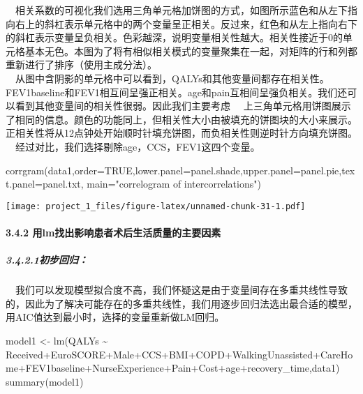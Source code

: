 \documentclass[
]{article}
\newenvironment{Shaded}{\begin{snugshade}}{\end{snugshade}}
\newcommand{\AttributeTok}[1]{\textcolor[rgb]{0.77,0.63,0.00}{#1}}
\newcommand{\ConstantTok}[1]{\textcolor[rgb]{0.00,0.00,0.00}{#1}}
\newcommand{\FunctionTok}[1]{\textcolor[rgb]{0.00,0.00,0.00}{#1}}
\newcommand{\NormalTok}[1]{#1}
\newcommand{\OtherTok}[1]{\textcolor[rgb]{0.56,0.35,0.01}{#1}}
\newcommand{\SpecialCharTok}[1]{\textcolor[rgb]{0.00,0.00,0.00}{#1}}
\newcommand{\StringTok}[1]{\textcolor[rgb]{0.31,0.60,0.02}{#1}}
\begin{document}
 相关系数的可视化我们选用三角单元格加饼图的方式，如图所示蓝色和从左下指向右上的斜杠表示单元格中的两个变量呈正相关。反过来，红色和从左上指向右下的斜杠表示变量呈负相关。色彩越深，说明变量相关性越大。相关性接近于0的单元格基本无色。本图为了将有相似相关模式的变量聚集在一起，对矩阵的行和列都重新进行了排序（使用主成分法）。\\
 从图中含阴影的单元格中可以看到，QALYs和其他变量间都存在相关性。FEV1baseline和FEV1相互间呈强正相关。age和pain互相间呈强负相关。我们还可以看到其他变量间的相关性很弱。因此我们主要考虑
 上三角单元格用饼图展示了相同的信息。颜色的功能同上，但相关性大小由被填充的饼图块的大小来展示。正相关性将从12点钟处开始顺时针填充饼图，而负相关性则逆时针方向填充饼图。\\
 经过对比，我们选择剔除age，CCS，FEV1这四个变量。

\begin{Shaded}
\begin{Highlighting}[]
\FunctionTok{corrgram}\NormalTok{(data1,}\AttributeTok{order=}\ConstantTok{TRUE}\NormalTok{,}\AttributeTok{lower.panel=}\NormalTok{panel.shade,}\AttributeTok{upper.panel=}\NormalTok{panel.pie,}\AttributeTok{text.panel=}\NormalTok{panel.txt, }\AttributeTok{main=}\StringTok{"correlogram of intercorrelations"}\NormalTok{)}
\end{Highlighting}
\end{Shaded}

\texttt{[image: project\_1\_files/figure-latex/unnamed-chunk-31-1.pdf]}

\hypertarget{ux7528lmux627eux51faux5f71ux54cdux60a3ux8005ux672fux540eux751fux6d3bux8d28ux91cfux7684ux4e3bux8981ux56e0ux7d20}{%
\paragraph{3.4.2
用lm找出影响患者术后生活质量的主要因素}\label{ux7528lmux627eux51faux5f71ux54cdux60a3ux8005ux672fux540eux751fux6d3bux8d28ux91cfux7684ux4e3bux8981ux56e0ux7d20}}

\hypertarget{ux521dux6b65ux56deux5f52}{%
\subparagraph{3.4.2.1初步回归：}\label{ux521dux6b65ux56deux5f52}}

 我们可以发现模型拟合度不高，我们怀疑这是由于变量间存在多重共线性导致的，因此为了解决可能存在的多重共线性，我们用逐步回归法选出最合适的模型，用AIC值达到最小时，选择的变量重新做LM回归。

\begin{Shaded}
\begin{Highlighting}[]
\NormalTok{model1 }\OtherTok{\textless{}{-}} \FunctionTok{lm}\NormalTok{(QALYs }\SpecialCharTok{\textasciitilde{}}\NormalTok{ Received}\SpecialCharTok{+}\NormalTok{EuroSCORE}\SpecialCharTok{+}\NormalTok{Male}\SpecialCharTok{+}\NormalTok{CCS}\SpecialCharTok{+}\NormalTok{BMI}\SpecialCharTok{+}\NormalTok{COPD}\SpecialCharTok{+}\NormalTok{WalkingUnassisted}\SpecialCharTok{+}\NormalTok{CareHome}\SpecialCharTok{+}\NormalTok{FEV1baseline}\SpecialCharTok{+}\NormalTok{NurseExperience}\SpecialCharTok{+}\NormalTok{Pain}\SpecialCharTok{+}\NormalTok{Cost}\SpecialCharTok{+}\NormalTok{age}\SpecialCharTok{+}\NormalTok{recovery\_time,data1)}
\FunctionTok{summary}\NormalTok{(model1)}
\end{Highlighting}
\end{Shaded}
\end{document}
